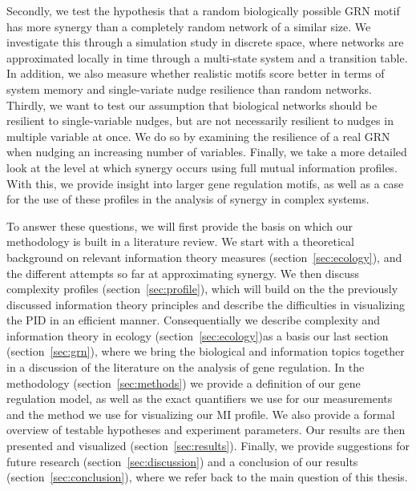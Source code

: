 \documentclass[../main.tex]{subfiles}
\begin{document}
Secondly, we test the hypothesis that a random biologically possible GRN motif has more synergy than a completely random network of a similar size. 
We investigate this through a simulation study in discrete space, where networks are approximated locally in time through a multi-state system and a transition table.
In addition, we also measure whether realistic motifs score better in terms of system memory and single-variate nudge resilience than random networks. %
Thirdly, we want to test our assumption that biological networks should be resilient to single-variable nudges, but are not necessarily resilient to nudges in multiple variable at once.
We do so by examining the resilience of a real GRN when nudging an increasing number of variables.
Finally, we take a more detailed look at the level at which synergy occurs using full mutual information profiles.
With this, we provide insight into larger gene regulation motifs, as well as a case for the use of these profiles in the analysis of synergy in complex systems.

To answer these questions, we will first provide the basis on which our methodology is built in a literature review.
We start with a theoretical background on relevant information theory measures (section~\ref{sec:ecology}), and the different attempts so far at approximating synergy.
We then discuss complexity profiles (section~\ref{sec:profile}), which will build on the the previously discussed information theory principles and describe the difficulties in visualizing the PID in an efficient manner.
Consequentially we describe complexity and information theory in ecology (section~\ref{sec:ecology})as a basis our last section (section~\ref{sec:grn}), where we bring the biological and information topics together in a discussion of the literature on the analysis of gene regulation.
In the methodology (section~\ref{sec:methods}) we provide a definition of our gene regulation model, as well as the exact quantifiers we use for our measurements and the method we use for visualizing our MI profile.
We also provide a formal overview of testable hypotheses and experiment parameters.
Our results are then presented and visualized (section~\ref{sec:results}).
Finally, we provide suggestions for future research (section~\ref{sec:discussion}) and a conclusion of our results (section~\ref{sec:conclusion}), where we refer back to the main question of this thesis.
\end{document}
